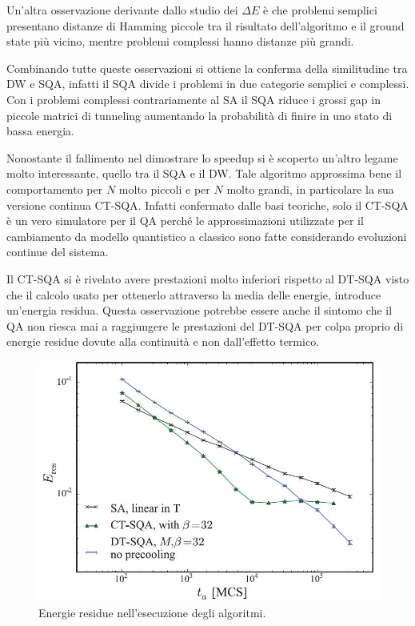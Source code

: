 Un'altra osservazione derivante dallo studio dei $\Delta E$ è che problemi semplici presentano distanze di Hamming piccole tra il risultato dell'algoritmo e il ground state più vicino, mentre problemi complessi hanno distanze più grandi.

Combinando tutte queste osservazioni si ottiene la conferma della similitudine tra DW e SQA, infatti il SQA divide i problemi in due categorie semplici e complessi. Con i problemi complessi contrariamente al SA il SQA riduce i grossi gap in piccole matrici di tunneling aumentando la probabilità di finire in uno stato di bassa energia.

Nonostante il fallimento nel dimostrare lo speedup si è scoperto un'altro legame molto interessante, quello tra il SQA e il DW. Tale algoritmo approssima bene il comportamento per $N$ molto piccoli e per $N$ molto grandi\cite{EQA}, in particolare la sua versione continua CT-SQA\cite{QVC}. Infatti confermato dalle basi teoriche, solo il CT-SQA è un vero simulatore per il QA perché le approssimazioni utilizzate per il cambiamento da modello quantistico a classico sono fatte considerando evoluzioni continue del sistema.

Il CT-SQA si è rivelato avere prestazioni molto inferiori rispetto al DT-SQA visto che il calcolo usato per ottenerlo attraverso la media delle energie, introduce un'energia residua. Questa osservazione potrebbe essere anche il sintomo che il QA non riesca mai a raggiungere le prestazioni del DT-SQA per colpa proprio di energie residue dovute alla continuità e non dall'effetto termico.

\begin{figure}[htbp]
  \centering
  \includegraphics[scale=0.6]{Immagini/residua.jpg}
  \caption{Energie residue nell'esecuzione degli algoritmi.}
  \label{figura:residua}
\end{figure}

